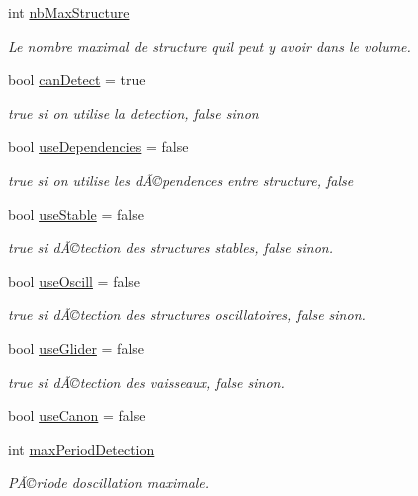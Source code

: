 \begin{DoxyCompactItemize}
int \mbox{\hyperlink{class_detection_a3cb9e6ab5eb48c7352b5402e9d46c4e6}{nb\+Max\+Structure}}
\begin{DoxyCompactList}\small\item\em Le nombre maximal de structure qu\textquotesingle{}il peut y avoir dans le volume. \end{DoxyCompactList}\item 
bool \mbox{\hyperlink{class_detection_a699901c5a7439b08e8ac5c36942bb61b}{can\+Detect}} = true
\begin{DoxyCompactList}\small\item\em true si on utilise la detection, false sinon \end{DoxyCompactList}\item 
bool \mbox{\hyperlink{class_detection_abe71ec7aa825173786fd273323343c11}{use\+Dependencies}} = false
\begin{DoxyCompactList}\small\item\em true si on utilise les dÃ©pendences entre structure, false \end{DoxyCompactList}\item 
bool \mbox{\hyperlink{class_detection_a78bb8c89cca9479bb2bb4ef0f5e96945}{use\+Stable}} = false
\begin{DoxyCompactList}\small\item\em true si dÃ©tection des structures stables, false sinon. \end{DoxyCompactList}\item 
bool \mbox{\hyperlink{class_detection_a9597ce1e1dea98c61902d891c1f1c7e0}{use\+Oscill}} = false
\begin{DoxyCompactList}\small\item\em true si dÃ©tection des structures oscillatoires, false sinon. \end{DoxyCompactList}\item 
bool \mbox{\hyperlink{class_detection_af1181c7a5cdf8fe0f94e2e6526a1ffb1}{use\+Glider}} = false
\begin{DoxyCompactList}\small\item\em true si dÃ©tection des vaisseaux, false sinon. \end{DoxyCompactList}\item 
bool \mbox{\hyperlink{class_detection_a3fe2d8aec9ad4e2a8f11902ba873db52}{use\+Canon}} = false
\item 
int \mbox{\hyperlink{class_detection_a98167fc0f3e26398cfd51f95b6a64e72}{max\+Period\+Detection}}
\begin{DoxyCompactList}\small\item\em PÃ©riode d\textquotesingle{}oscillation maximale. \end{DoxyCompactList}\item 

\end{DoxyCompactItemize}
